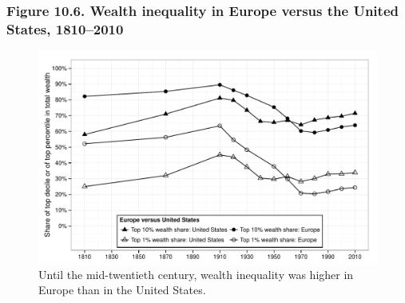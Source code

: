 \documentclass[t]{beamer}\usepackage[]{graphicx}\usepackage[]{color}
\newenvironment{knitrout}{}{} %
\begin{document}
\begin{frame}[label=Figure_10_6]
\frametitle{Figure 10.6. Wealth inequality in Europe versus the United States, 1810--2010}
\begin{figure}[t]
\begin{minipage}[b]{\textwidth}
\centering
\begin{knitrout}\footnotesize
{}\color{fgcolor}

{\centering \includegraphics[width=1\linewidth]{figures/bw/Figure_10_6} 

}



\end{knitrout}
\caption{Until the mid-twentieth century, wealth inequality was higher in Europe than in the United States.}
\end{minipage}
\end{figure}
\end{frame}
\end{document}
